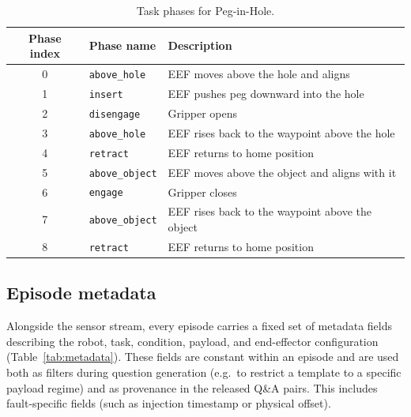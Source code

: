 \begin{table}[htbp]
    \centering
    \caption{Task phases for Peg-in-Hole.}
    \label{tab:phases_peg}
    \small
    \begin{tabular}{clp{8cm}}
        \toprule
        Phase index & Phase name             & Description                                     \\
        \midrule
        0           & \texttt{above\_hole}   & EEF moves above the hole and aligns             \\
        1           & \texttt{insert}        & EEF pushes peg downward into the hole           \\
        2           & \texttt{disengage}     & Gripper opens                                   \\
        3           & \texttt{above\_hole}   & EEF rises back to the waypoint above the hole   \\
        4           & \texttt{retract}       & EEF returns to home position                    \\
        5           & \texttt{above\_object} & EEF moves above the object and aligns with it   \\
        6           & \texttt{engage}        & Gripper closes                                  \\
        7           & \texttt{above\_object} & EEF rises back to the waypoint above the object \\
        8           & \texttt{retract}       & EEF returns to home position                    \\
        \bottomrule
    \end{tabular}
\end{table}

\subsection{Episode metadata}

Alongside the sensor stream, every episode carries a fixed set of metadata fields describing the robot, task, condition, payload, and end-effector configuration (Table~\ref{tab:metadata}). These fields are constant within an episode and are used both as filters during question generation (e.g.\ to restrict a template to a specific payload regime) and as provenance in the released Q\&A pairs. This includes fault-specific fields (such as injection timestamp or physical offset).

